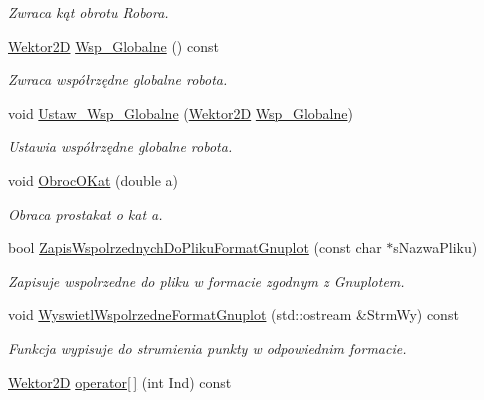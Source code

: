\begin{DoxyCompactItemize}
\begin{DoxyCompactList}\small\item\em Zwraca kąt obrotu Robora. \end{DoxyCompactList}\item 
\hypertarget{class_robot_a327dff2175436c0be586e17c12bd9969}{\hyperlink{class_wektor2_d}{Wektor2\+D} \hyperlink{class_robot_a327dff2175436c0be586e17c12bd9969}{Wsp\+\_\+\+Globalne} () const }\label{class_robot_a327dff2175436c0be586e17c12bd9969}

\begin{DoxyCompactList}\small\item\em Zwraca współrzędne globalne robota. \end{DoxyCompactList}\item 
\hypertarget{class_robot_a1ad31789d90f6af2b3d512359e2e8421}{void \hyperlink{class_robot_a1ad31789d90f6af2b3d512359e2e8421}{Ustaw\+\_\+\+Wsp\+\_\+\+Globalne} (\hyperlink{class_wektor2_d}{Wektor2\+D} \hyperlink{class_robot_a327dff2175436c0be586e17c12bd9969}{Wsp\+\_\+\+Globalne})}\label{class_robot_a1ad31789d90f6af2b3d512359e2e8421}

\begin{DoxyCompactList}\small\item\em Ustawia współrzędne globalne robota. \end{DoxyCompactList}\item 
void \hyperlink{class_robot_a4d5ca83fe9dee72eddd8c6df97a0e10d}{Obroc\+O\+Kat} (double a)
\begin{DoxyCompactList}\small\item\em Obraca prostakat o kat a. \end{DoxyCompactList}\item 
bool \hyperlink{class_robot_a8e9a1014f600141e9a9514d6622b3394}{Zapis\+Wspolrzednych\+Do\+Pliku\+Format\+Gnuplot} (const char $\ast$s\+Nazwa\+Pliku)
\begin{DoxyCompactList}\small\item\em Zapisuje wspolrzedne do pliku w formacie zgodnym z Gnuplotem. \end{DoxyCompactList}\item 
\hypertarget{class_robot_a1a73604f8395ef66e6bf1e470108a77e}{void \hyperlink{class_robot_a1a73604f8395ef66e6bf1e470108a77e}{Wyswietl\+Wspolrzedne\+Format\+Gnuplot} (std\+::ostream \&Strm\+Wy) const }\label{class_robot_a1a73604f8395ef66e6bf1e470108a77e}

\begin{DoxyCompactList}\small\item\em Funkcja wypisuje do strumienia punkty w odpowiednim formacie. \end{DoxyCompactList}\item 
\hypertarget{class_robot_acd7c1bebb006bce05ae347e93d535f55}{\hyperlink{class_wektor2_d}{Wektor2\+D} \hyperlink{class_robot_acd7c1bebb006bce05ae347e93d535f55}{operator\mbox{[}$\,$\mbox{]}} (int Ind) const }\label{class_robot_acd7c1bebb006bce05ae347e93d535f55}


\end{DoxyCompactItemize}
